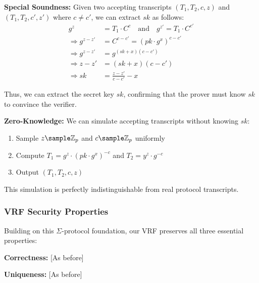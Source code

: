 \textbf{Special Soundness:} Given two accepting transcripts $(T_1, T_2, c, z)$ and $(T_1, T_2, c', z')$ where $c \neq c'$, we can extract $sk$ as follows:
\begin{align}
g^z &= T_1 \cdot C^c \quad \text{and} \quad g^{z'} = T_1 \cdot C^{c'}\\
\Rightarrow g^{z-z'} &= C^{c-c'} = (pk \cdot g^x)^{c-c'}\\
\Rightarrow g^{z-z'} &= g^{(sk+x)(c-c')}\\
\Rightarrow z-z' &= (sk+x)(c-c')\\
\Rightarrow sk &= \frac{z-z'}{c-c'} - x
\end{align}

Thus, we can extract the secret key $sk$, confirming that the prover must know $sk$ to convince the verifier.

\textbf{Zero-Knowledge:} We can simulate accepting transcripts without knowing $sk$:
\begin{enumerate}
    \item Sample $z \sample \mathbb{Z}_p$ and $c \sample \mathbb{Z}_p$ uniformly
    \item Compute $T_1 = g^z \cdot (pk \cdot g^x)^{-c}$ and $T_2 = y^z \cdot g^{-c}$
    \item Output $(T_1, T_2, c, z)$
\end{enumerate}
This simulation is perfectly indistinguishable from real protocol transcripts.

\subsubsection{VRF Security Properties}
Building on this $\Sigma$-protocol foundation, our VRF preserves all three essential properties:

\textbf{Correctness:} [As before]

\textbf{Uniqueness:} [As before]

